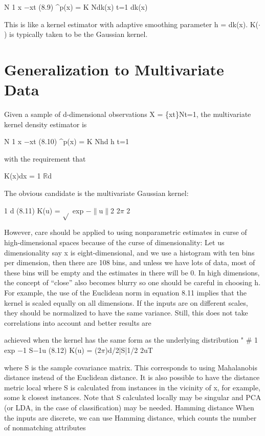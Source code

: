 N 1 x $-$xt (8.9) \textasciicircum{}p(x) = K Ndk(x) t=1 dk(x)

This is like a kernel estimator with adaptive smoothing parameter h = dk(x). K($\cdot$) is typically taken to be the Gaussian kernel.

\section{Generalization to Multivariate Data}

Given a sample of d-dimensional observations X = \{xt\}Nt=1, the multivariate kernel density estimator is

N 1 x $-$xt (8.10) \textasciicircum{}p(x) = K Nhd h t=1

with the requirement that

K(x)dx = 1 $\mathbb{R}$d

The obvious candidate is the multivariate Gaussian kernel:

1 d (8.11) K(u) = $\sqrt{}$ exp $-$$\parallel$u$\parallel$2 2$\pi$ 2

However, care should be applied to using nonparametric estimates in curse of high-dimensional spaces because of the curse of dimensionality: Let us dimensionality say x is eight-dimensional, and we use a histogram with ten bins per dimension, then there are 108 bins, and unless we have lots of data, most of these bins will be empty and the estimates in there will be 0. In high dimensions, the concept of “close” also becomes blurry so one should be careful in choosing h. For example, the use of the Euclidean norm in equation 8.11 implies that the kernel is scaled equally on all dimensions. If the inputs are on different scales, they should be normalized to have the same variance. Still, this does not take correlations into account and better results are

achieved when the kernel has the same form as the underlying distribution " \# 1 exp $-$1 S$-$1u (8.12) K(u) = (2$\pi$)d/2|S|1/2 2uT

where S is the sample covariance matrix. This corresponds to using Mahalanobis distance instead of the Euclidean distance. It is also possible to have the distance metric local where S is calculated from instances in the vicinity of x, for example, some k closest instances. Note that S calculated locally may be singular and PCA (or LDA, in the case of classification) may be needed. Hamming distance When the inputs are discrete, we can use Hamming distance, which counts the number of nonmatching attributes

